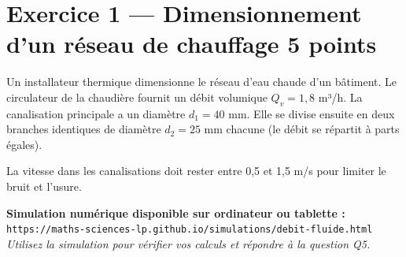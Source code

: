 \documentclass[a4paper,11pt]{article}
\newcommand{\pts}[1]{\hfill\textcolor{gris}{\small\textbf{#1}}}
\begin{document}
\newpage

\section*{Exercice 1 — Dimensionnement d'un réseau de chauffage \pts{5 points}}

\begin{contextebox}
Un installateur thermique dimensionne le réseau d'eau chaude d'un bâtiment. Le circulateur de la chaudière fournit un débit volumique $Q_v = 1{,}8$ m³/h. La canalisation principale a un diamètre $d_1 = 40$ mm. Elle se divise ensuite en deux branches identiques de diamètre $d_2 = 25$ mm chacune (le débit se répartit à parts égales).

La vitesse dans les canalisations doit rester entre 0,5 et 1,5 m/s pour limiter le bruit et l'usure.

\medskip
\textbf{Simulation numérique disponible sur ordinateur ou tablette :}\\
\texttt{https://maths-sciences-lp.github.io/simulations/debit-fluide.html}\\
\textit{Utilisez la simulation pour vérifier vos calculs et répondre à la question Q5.}
\end{contextebox}

\begin{center}
\end{center}
\end{document}

